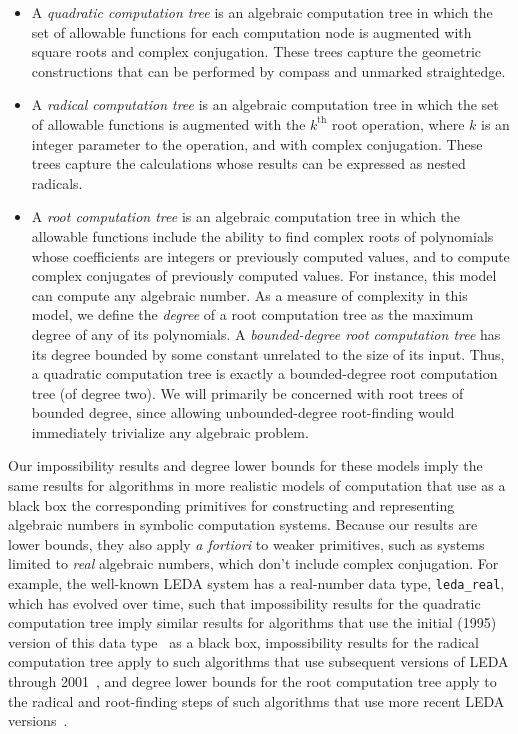 \documentclass[oribibl,10pt]{llncs}
\newcommand{\nth}[1]{$#1^\text{th}$}
\begin{document}
\begin{itemize}
\item 
A \emph{quadratic computation tree} is an algebraic computation tree in which the set of allowable functions for each computation node is augmented with square roots and complex conjugation. These trees capture the geometric constructions that can be performed by compass and unmarked straightedge.
\item 
A \emph{radical computation tree} is an algebraic computation tree in which the 
set of allowable functions is augmented with the \nth{k} root operation, 
where $k$ is an integer parameter to the operation, and with complex conjugation. These trees capture the calculations whose results can be expressed as nested radicals.
\item 
A \emph{root computation tree} is an algebraic computation tree in which the allowable functions include the ability to find complex roots of polynomials whose coefficients are integers or previously computed values, and to compute complex conjugates of previously computed values. 
For instance, this model can compute any algebraic number.
As a measure of complexity in this model, we define
the \emph{degree} of a root computation tree as the maximum degree of any of its polynomials.
A \emph{bounded-degree root computation tree}
has its degree bounded by some constant unrelated to the size of its input.
Thus, a quadratic computation tree is exactly a 
bounded-degree root computation tree (of degree two).
\ifFull
We will primarily be concerned with root trees of bounded degree, since allowing unbounded-degree root-finding would immediately trivialize any algebraic problem.
\fi
\end{itemize}
Our impossibility results and degree lower bounds for these models 
imply the same 
results for algorithms in more realistic models of computation that use as a black box the corresponding primitives 
for constructing and representing algebraic numbers in
symbolic computation systems.
Because our results are lower bounds, they also apply \textit{a fortiori} to weaker primitives, such as systems limited to \emph{real} algebraic numbers, which
don't include complex conjugation.
\ifFull
For example, the well-known LEDA system has a real-number 
data type, \texttt{leda\_real}, which has evolved over time,
such that impossibility results for the quadratic computation tree 
imply similar results for algorithms that use the initial (1995) version 
of this data type~\cite{Burnikel:1995} as a black box,
impossibility results for the radical computation tree apply to such
algorithms that use subsequent
versions of LEDA through 2001~\cite{MehSch-SAMVM-01}, and degree lower bounds
for the root computation tree apply to 
the radical and root-finding steps 
of such algorithms that use more recent LEDA versions~\cite{s-doie-05}.
\fi
\end{document}
